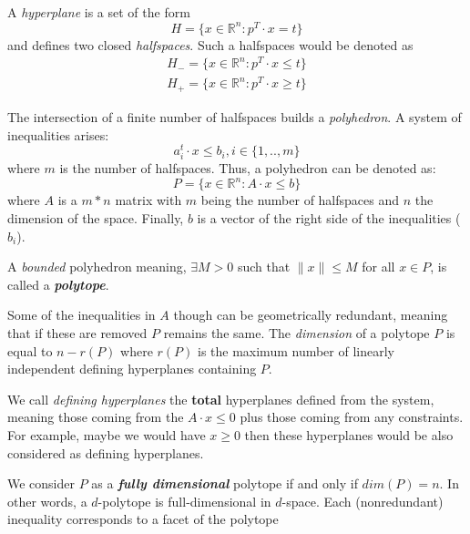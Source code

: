    A \textit{hyperplane} is a set of the form
   \begin{equation}
      H = \{x \in \mathbb{R}^n : p^{T} \cdot x = t \}      
   \end{equation}
   and defines two closed \textit{halfspaces}.
   Such a halfspaces would be denoted as
   \begin{equation}
      \begin{split}
         H_{-} = \{ x \in \mathbb{R}^n : p^{T} \cdot x \leq t \} \\
         H_{+} = \{ x \in \mathbb{R}^n : p^{T} \cdot x \geq t \}               
      \end{split}
   \end{equation}

   The intersection of a finite number of halfspaces builds a \textit{polyhedron}.
   A system of inequalities arises:
   \begin{equation}
      a_{i}^{t} \cdot x \leq b_{i},  i \in \{1, .., m\}      
   \end{equation} 
   where $m$ is the number of halfspaces. 
   Thus, a polyhedron can be denoted as:
   \begin{equation}
      P = \{ x \in \mathbb{R}^n : A \cdot x \leq b \}
   \end{equation}
   where $A$ is a $m*n$ matrix
   with $m$ being the number of halfspaces 
   and $n$ the dimension of the space. 
   Finally, $b$ is a vector of the right side of the inequalities ($b_{i}$).
   
   A \textit{bounded} polyhedron meaning, 
   $ \exists M > 0$ such that $\|x\| \leq M$ for all $x \in P$,
   is called a \textit{\textbf{polytope}}.
   
   Some of the inequalities in $A$ though can be geometrically redundant,
   meaning that if these are removed $P$ remains the same. 
   The \textit{dimension} of a polytope $P$ is equal to $n - r(P)$
   where $r(P)$ is the maximum number of linearly independent 
   defining hyperplanes containing $P$.

   We call \textit{defining hyperplanes} the \textbf{total}
   hyperplanes defined from the system, meaning 
   those coming from the $A \cdot x \leq 0$ 
   plus those coming from any constraints. 
   For example, maybe we would have $x \geq 0$ then these hyperplanes would be also considered
   as defining hyperplanes.

   We consider $P$ as a \textit{\textbf{fully dimensional}} polytope
   if and only if $dim(P) = n$.
   In other words, 
   a $d$-polytope is full-dimensional in $d$-space.
   Each (nonredundant) inequality corresponds to a facet of the polytope

